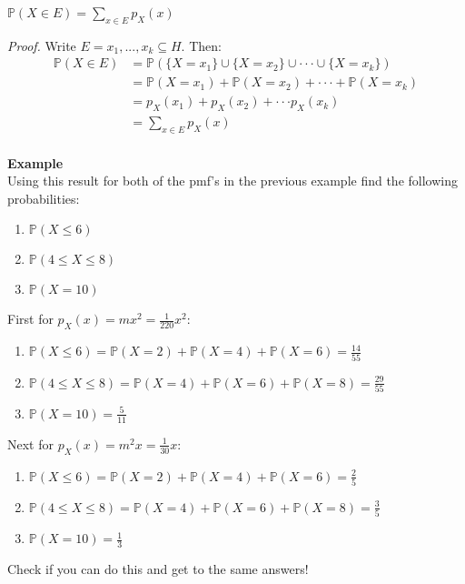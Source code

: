 \documentclass[,oneside]{article}
\begin{document}
\begin{enumerate}
\begin{center}
$\mathbb{P}(X \in E) = \sum\limits_{x \in E}p_X(x)$
\end{center}
\textit{Proof.} Write $E = {x_1,...,x_k} \subseteq H.$ Then:
\begin{align*}
\mathbb{P}(X \in E) &= \mathbb{P}(\{X = x_1\} \cup \{X = x_2\} \cup \cdot \cdot \cdot \cup \{X = x_k\})\\
&= \mathbb{P}(X = x_1) + \mathbb{P}(X = x_2) + \cdot \cdot \cdot + \mathbb{P}(X = x_k)\\
&= p_X(x_1) + p_X(x_2) + \cdot \cdot \cdot p_X(x_k)\\
&= \sum\limits_{x \in E} p_X(x)
\end{align*}\\
\textbf{Example}\\
Using this result for both of the pmf's in the previous example find the following probabilities:\\
\begin{enumerate}
\item $\mathbb{P}(X \leq 6)$
\item $\mathbb{P}(4 \leq X \leq 8)$
\item $\mathbb{P}(X = 10)$\\
\end{enumerate}
First for $p_X(x)=mx^2=\frac{1}{220}x^2:$\\
\begin{enumerate}
\item $\mathbb{P}(X \leq 6)=\mathbb{P}(X = 2)+\mathbb{P}(X = 4)+\mathbb{P}(X = 6)=\frac{14}{55}$
\item $\mathbb{P}(4 \leq X \leq 8)=\mathbb{P}(X = 4)+\mathbb{P}(X = 6)+\mathbb{P}(X = 8)=\frac{29}{55}$
\item $\mathbb{P}(X = 10)=\frac{5}{11}$\\
\end{enumerate}
Next for $p_X(x)=m^2x=\frac{1}{30}x:$\\
\begin{enumerate}
\item $\mathbb{P}(X \leq 6)=\mathbb{P}(X = 2)+\mathbb{P}(X = 4)+\mathbb{P}(X = 6)=\frac{2}{5}$
\item $\mathbb{P}(4 \leq X \leq 8)=\mathbb{P}(X = 4)+\mathbb{P}(X = 6)+\mathbb{P}(X = 8)=\frac{3}{5}$
\item $\mathbb{P}(X = 10)=\frac{1}{3}$
\end{enumerate}
Check if you can do this and get to the same answers!\\
\\

\end{enumerate}
\end{document}
